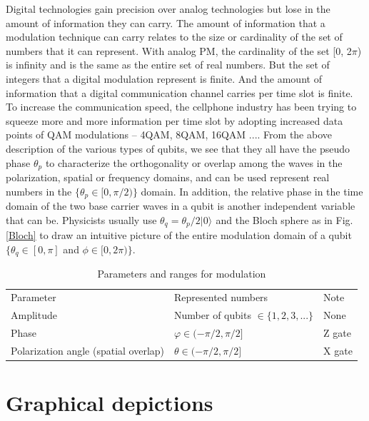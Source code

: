 \documentclass{book}
\newcommand{\keta}[2][]{\vert {#2} \rangle_{#1}}
\begin{document}
Digital technologies gain precision over analog technologies but lose in the amount of information they can carry. The amount of information that a modulation technique can carry relates to the size or cardinality of the set of numbers that it can represent. With analog PM, the cardinality of the set [0, 2$\pi$) is infinity and is the same as the entire set of real numbers. But the set of integers that a digital modulation represent is finite. And the amount of information that a digital communication channel carries per time slot is finite. To increase the communication speed, the cellphone industry has been trying to squeeze more and more information per time slot by adopting increased data points of QAM modulations -- 4QAM, 8QAM, 16QAM ....
From the above description of the various types of qubits, we see that they all have the pseudo phase $\theta_p$ to characterize the 
orthogonality or overlap among the waves in the polarization, spatial or frequency domains, and can be used represent real numbers in the $\{\theta_p \in [0, \pi/2)\}$ domain. In addition, the relative phase in the time domain of the two base carrier waves in a qubit is another independent variable that can be. Physicists usually use $\theta_q = \theta_p/2 \keta{0}$ and the Bloch sphere as in Fig. \ref{Bloch} to draw an intuitive picture of the entire modulation domain of a qubit $\{\theta_q \in [0, \pi]$ and $\phi \in [0, 2\pi)\}$.

\begin{table}[]
\caption{Parameters and ranges for modulation}
\label{modulation-parameters}
\begin{tabular}{lll}
Parameter &Represented numbers &Note                 \\
Amplitude &Number of qubits $\in \{1, 2, 3, ...\}$   & None \\
Phase & $\varphi \in (-\pi /2, \pi /2] $& Z gate \\
Polarization angle (spatial overlap) & $\theta \in (-\pi /2, \pi /2]$ &X gate
\end{tabular}
\end{table}

\section{Graphical depictions}
\end{document}
